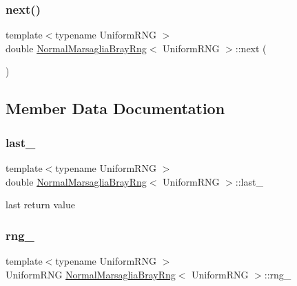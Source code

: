 \hypertarget{class_normal_marsaglia_bray_rng_a2cc54f5f331a5bd71eedc67c84db7279}{}\label{class_normal_marsaglia_bray_rng_a2cc54f5f331a5bd71eedc67c84db7279} 
\subsubsection{\texorpdfstring{next()}{next()}}
{\footnotesize\ttfamily template$<$typename Uniform\+R\+NG $>$ \\
double \hyperlink{class_normal_marsaglia_bray_rng}{Normal\+Marsaglia\+Bray\+Rng}$<$ Uniform\+R\+NG $>$\+::next (\begin{DoxyParamCaption}{ }\end{DoxyParamCaption})}



\subsection{Member Data Documentation}
\hypertarget{class_normal_marsaglia_bray_rng_a39a4a809c38812b344b3695b915133c6}{}\label{class_normal_marsaglia_bray_rng_a39a4a809c38812b344b3695b915133c6} 
\subsubsection{\texorpdfstring{last\+\_\+}{last\_}}
{\footnotesize\ttfamily template$<$typename Uniform\+R\+NG $>$ \\
double \hyperlink{class_normal_marsaglia_bray_rng}{Normal\+Marsaglia\+Bray\+Rng}$<$ Uniform\+R\+NG $>$\+::last\+\_\+\hspace{0.3cm}{\ttfamily [private]}}



last return value 

\hypertarget{class_normal_marsaglia_bray_rng_a590b5bfbb3888d5163c6e3d702bfb2e0}{}\label{class_normal_marsaglia_bray_rng_a590b5bfbb3888d5163c6e3d702bfb2e0} 
\subsubsection{\texorpdfstring{rng\+\_\+}{rng\_}}
{\footnotesize\ttfamily template$<$typename Uniform\+R\+NG $>$ \\
Uniform\+R\+NG \hyperlink{class_normal_marsaglia_bray_rng}{Normal\+Marsaglia\+Bray\+Rng}$<$ Uniform\+R\+NG $>$\+::rng\+\_\+\hspace{0.3cm}{\ttfamily [private]}}

